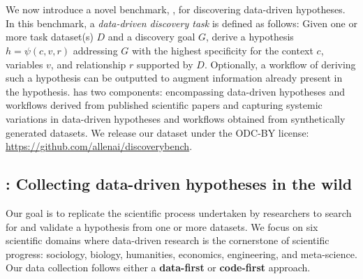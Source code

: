 \newcommand{\hmsscore}{\mathrm{HMS}}
\newcommand{\contextscore}{\mathrm{ctx}_\mathrm{F1}}
\newcommand{\variablescore}{\mathrm{var}_\mathrm{F1}}
\newcommand{\relationscore}{\mathrm{rel}_\mathrm{acc}}

\section{\discoverybench}
\label{sec:discovery_bench}

We now introduce a novel benchmark, \discoverybench{}, for discovering data-driven hypotheses. In this benchmark, a \emph{data-driven discovery task} is defined as follows: Given one or more task dataset(s)
$D$ and a discovery goal $G$, derive a hypothesis $h = \psi(c,v,r)$ addressing $G$ with the highest specificity for the context $c$, variables $v$, and relationship $r$ supported by $D$. Optionally, a workflow of deriving such a hypothesis can be outputted to augment information already present in the hypothesis. \discoverybench{} has two components: \textbf{\real}
encompassing data-driven hypotheses and workflows derived from published scientific papers and \textbf{\synth} capturing systemic variations in data-driven hypotheses and workflows obtained from synthetically generated datasets. We release our dataset under the ODC-BY license: \url{https://github.com/allenai/discoverybench}.


\subsection{\real: Collecting data-driven hypotheses in the wild}

Our goal is to replicate the scientific process undertaken by researchers to search for and validate a hypothesis from one or more datasets. We focus on six scientific domains where data-driven research is the cornerstone of scientific progress: sociology, biology, humanities, economics, engineering, and meta-science. Our data collection follows either a \textbf{data-first} or \textbf{code-first} approach.

